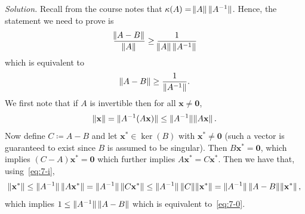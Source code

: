 \documentclass{article}
\def\*#1{\mathbf{#1}}
\begin{document}
\textit{Solution.}
Recall from the course notes that $\kappa(A) = \enVert{A} \enVert[0]{A^{-1}}$.
Hence, the statement we need to prove is
%
\begin{equation*}
    \frac{\enVert{A - B}}{\enVert{A}} \geq \frac{1}{\enVert{A} \enVert[0]{A^{-1}}}
\end{equation*}
%
which is equivalent to
%
\begin{equation}
    \enVert{A - B} \geq \frac{1}{\enVert[0]{A^{-1}}}
    \label{eq:7-0}
    .
\end{equation}
%
We first note that if $A$ is invertible then for all $\*x \neq \*0$,
%
\begin{equation}
    \enVert{\*x}
        = \enVert[0]{A^{-1} (A \*x)}
        \leq \enVert[0]{A^{-1}} \enVert{A \*x}
        \label{eq:7-i}
        .
\end{equation}
%
Now define $C \coloneqq A - B$ and let $\*x^* \in \ker(B)$ with $\*x^* \neq \*0$
(such a vector is guaranteed to exist since $B$ is assumed to be singular). Then
$B \*x^* = \*0$, which implies $(C - A) \*x^* = \*0$ which further implies
$A \*x^* = C \*x^*$. Then we have that, using~\eqref{eq:7-i},
%
\begin{equation*}
    \enVert{\*x^*}
    \leq \enVert[0]{A^{-1}} \enVert[0]{A \*x^*}
    = \enVert[0]{A^{-1}} \enVert[0]{C \*x^*}
    \leq \enVert[0]{A^{-1}} \enVert[0]{C} \enVert{\*x^*}
    = \enVert[0]{A^{-1}} \enVert[0]{A - B} \enVert{\*x^*}
    ,
\end{equation*}
%
which implies $1 \leq \enVert[0]{A^{-1}} \enVert[0]{A - B}$ which is equivalent to~\eqref{eq:7-0}.
\end{document}

